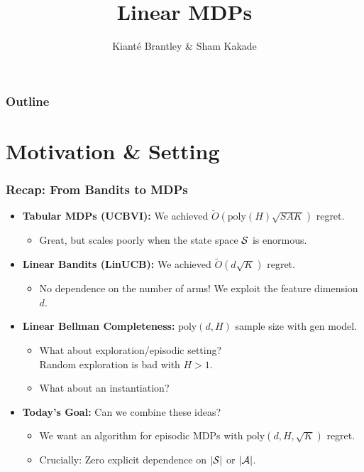\documentclass[aspectratio=169]{beamer}
\title[LinMDPs]{Linear MDPs}
\author[Sham \& Kiant\'{e}]{Kiant\'{e} Brantley \& Sham Kakade}
\date{}
\begin{document}
\begin{frame}
\titlepage  
\end{frame}

\begin{frame}[noframenumbering]
  \frametitle{Outline}
  \tableofcontents
\end{frame}

\section{Motivation \& Setting}

\begin{frame}\frametitle{Recap: From Bandits to MDPs}

\begin{itemize}
\item \textbf{Tabular MDPs (UCBVI):} We achieved $\tilde{O}(\textrm{poly}(H) \sqrt{S A K})$ regret. 
  \begin{itemize}
    \item Great, but scales poorly when the state space $\mathcal{S}$ is enormous.
  \end{itemize}
  
\vspace{0.2cm}
\item \textbf{Linear Bandits (LinUCB):} We achieved $\tilde{O}(d \sqrt{K})$ regret.
  \begin{itemize}
    \item No dependence on the number of arms! We exploit the feature dimension $d$.
  \end{itemize}

\vspace{0.2cm}
\item \textbf{Linear Bellman Completeness:}  $\textrm{poly}(d,H)$
  sample size with gen model.
  \begin{itemize}
  \item What about exploration/episodic setting? \\
    Random exploration is bad with $H>1$.
  \item What about an instantiation?
  \end{itemize}
  
\vspace{0.2cm}
\pause
\item \textbf{Today's Goal:} Can we combine these ideas? 
  \begin{itemize}
    \item We want an algorithm for episodic MDPs with $\text{poly}(d, H, \sqrt{K})$ regret.
    \item \alert{Crucially:} Zero explicit dependence on $|\mathcal{S}|$ or $|\mathcal{A}|$.
  \end{itemize}
\end{itemize}

\end{frame}
\end{document}
